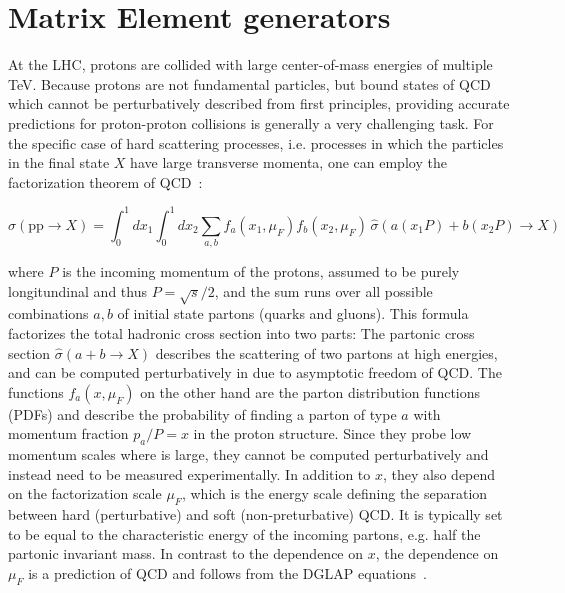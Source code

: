 \section{Matrix Element generators}
\label{sec:mc:me}


At the LHC, protons are collided with large center-of-mass energies of multiple TeV. Because protons are not fundamental particles, but bound states of QCD which cannot be perturbatively described from first principles, providing accurate predictions for proton-proton collisions is generally a very challenging task. For the specific case of hard scattering processes, i.e. processes in which the particles in the final state $X$ have large transverse momenta, one can employ the factorization theorem of QCD~\cite{Peskin:1995ev}:

\begin{equation}
\label{eq:mc:sigmahad}
    \sigma (\mathrm{pp} \rightarrow X) = \int_{0}^{1} dx_1 \int_{0}^{1} dx_2 \sum_ {a,b} f_a (x_1, \mu_F) f_b (x_2, \mu_F) \, \hat{\sigma} (a (x_1 P) + b (x_2 P) \rightarrow X)
\end{equation}

\noindent where $P$ is the incoming momentum of the protons, assumed to be purely longitundinal and thus $P = \sqrt{s}/2$, and the sum runs over all possible combinations $a,b$ of initial state partons (quarks and gluons). This formula factorizes the total hadronic cross section into two parts: The partonic cross section $\hat{\sigma} (a + b \rightarrow X)$ describes the scattering of two partons at high energies, and can be computed perturbatively in \alphas due to asymptotic freedom of QCD. The functions $f_a(x, \mu_F)$  on the other hand are the parton distribution functions (PDFs) and describe the probability of finding a parton of type $a$ with momentum fraction $p_a / P = x$ in the proton structure. Since they probe low momentum scales where \alphas is large, they cannot be computed perturbatively and instead need to be measured experimentally. In addition to $x$, they also depend on the factorization scale $\mu_F$, which is the energy scale defining the separation between hard (perturbative) and soft (non-preturbative) QCD. It is typically set to be equal to the characteristic energy of the incoming partons, e.g. half the partonic invariant mass. In contrast to the dependence on $x$, the dependence on $\mu_F$ is a prediction of QCD and follows from the DGLAP equations~\cite{Altarelli:1977zs,Skands:2012ts}.

